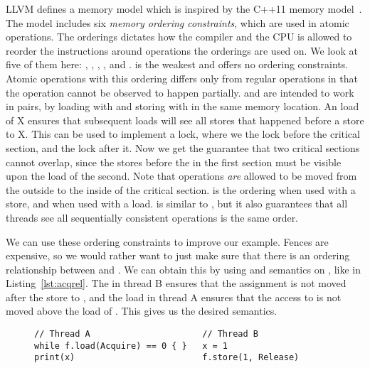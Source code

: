 \documentclass[b5paper]{report}
\begin{document}
LLVM defines a memory model which is inspired by the C++11 memory
model~\cite{llvmmm}. The model includes six \emph{memory ordering constraints},
which are used in atomic operations. The orderings dictates how the compiler and
the CPU is allowed to reorder the instructions around operations the orderings
are used on.  We look at five of them here: , ,
, , and .   is the
weakest and offers no ordering constraints. Atomic operations with this ordering
differs only from regular operations in that the operation cannot be observed to
happen partially.   and  are intended to work in
pairs, by loading with  and storing with  in the
same memory location.  An  load of X ensures that subsequent loads
will see all stores that happened before a  store to X.  This can
be used to implement a lock, where we  the lock before the
critical section, and  the lock after it.  Now we get the
guarantee that two critical sections cannot overlap, since the stores before the
 in the first section must be visible upon the 
load of the second. Note that operations \emph{are} allowed to be moved from the
outside to the inside of the critical section.  is the
 ordering when used with a store, and  when used
with a load.  is similar to , but it also
guarantees that all threads see all sequentially consistent operations is the
same order.

We can use these ordering constraints to improve our example. Fences are
expensive, so we would rather want to just make sure that there is an ordering
relationship between  and . We can obtain this by using
 and  semantics on , like in
Listing~\ref{lst:acqrel}. The  in thread B ensures that the
assignment  is not moved after the store to , and the
 load in thread A ensures that the access to  is not moved
above the load of . This gives us the desired semantics.

\begin{figure}[ht]
\begin{lstlisting}[caption=Synchronization using orderings,label=lst:acqrel]
// Thread A                      // Thread B
while f.load(Acquire) == 0 { }   x = 1
print(x)                         f.store(1, Release)
\end{lstlisting}
\end{figure}
\end{document}

